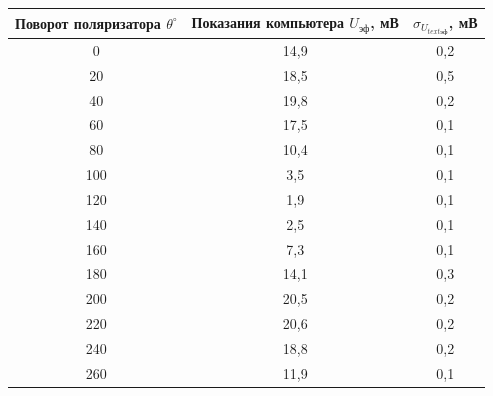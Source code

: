 \documentclass[a4paper,12pt]{article} %
\begin{document}
	\begin{table}[h!]
		\centering
		\begin{tabular}{|c|c|c|}
			\hline
			Поворот поляризатора $\theta ^\circ$ & Показания компьютера $U_{\text{эф}}$, мВ & $\sigma_{U_{text{эф}}}$, мВ \\ \hline
			0                                          & 14,9                                     & 0,2                         \\ \hline
			20                                         & 18,5                                     & 0,5                         \\ \hline
			40                                         & 19,8                                     & 0,2                         \\ \hline
			60                                         & 17,5                                     & 0,1                         \\ \hline
			80                                         & 10,4                                     & 0,1                         \\ \hline
			100                                        & 3,5                                      & 0,1                         \\ \hline
			120                                        & 1,9                                      & 0,1                         \\ \hline
			140                                        & 2,5                                      & 0,1                         \\ \hline
			160                                        & 7,3                                      & 0,1                         \\ \hline
			180                                        & 14,1                                     & 0,3                         \\ \hline
			200                                        & 20,5                                     & 0,2                         \\ \hline
			220                                        & 20,6                                     & 0,2                         \\ \hline
			240                                        & 18,8                                     & 0,2                         \\ \hline
			260                                        & 11,9                                     & 0,1                         \\ \hline

\end{tabular}
\end{table}
\end{document}
